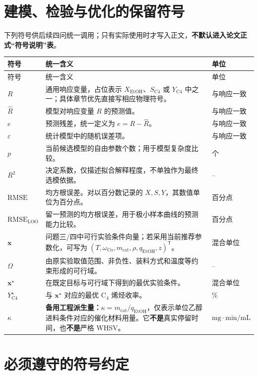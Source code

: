 \documentclass[UTF8,zihao=-4,a4paper,fontset=none]{ctexart}
\begin{document}
\section{建模、检验与优化的保留符号}

下列符号供后续四问统一调用；只有实际使用时才写入正文，\textbf{不默认进入论文正式“符号说明”表}。

\begin{longtable}{C{0.18\textwidth} L{0.52\textwidth} C{0.14\textwidth}}
\toprule
符号 & 统一含义 & 单位 \\
\midrule
\endfirsthead
\toprule
符号 & 统一含义 & 单位 \\
\midrule
\endhead
$R$ & 通用响应变量，占位表示 $X_{\mathrm{EtOH}}$、$S_{\mathrm{C4}}$ 或 $Y_{\mathrm{C4}}$ 中之一；具体章节优先直接写相应物理符号。 & 与响应一致 \\
$\widehat{R}$ & 模型对响应变量 $R$ 的预测值。 & 与响应一致 \\
$e$ & 预测残差，统一定义为 $e=R-\widehat{R}$。 & 与响应一致 \\
$\varepsilon$ & 统计模型中的随机误差项。 & 与响应一致 \\
$p$ & 当前候选模型的自由参数个数；用于模型复杂度比较。 & 个 \\
$R^2$ & 决定系数，仅描述拟合解释程度，不单独作为最终选模依据。 & -- \\
$\mathrm{RMSE}$ & 均方根误差。对以百分数记录的 $X,S,Y$，其数值单位为百分点。 & 百分点 \\
$\mathrm{RMSE}_{\mathrm{LOO}}$ & 留一预测的均方根误差，用于极小样本曲线的预测能力比较。 & 百分点 \\
$\bm{x}$ & 问题三/四中可行实验条件向量；若采用当前推荐参数化，可写为 $(T,\omega_{\mathrm{Co}},m_{\mathrm{cat}},\rho,q_{\mathrm{EtOH}},z)^{\mathsf T}$。 & 混合单位 \\
$\Omega$ & 由原实验取值范围、非负性、装料方式和温度等约束形成的可行域。 & -- \\
$\bm{x}^{\star}$ & 在既定目标与可行域下得到的最优实验条件。 & 混合单位 \\
$Y_{\mathrm{C4}}^{\star}$ & 与 $\bm{x}^{\star}$ 对应的最优 $\mathrm{C}_4$ 烯烃收率。 & \% \\
$\kappa$ & \textbf{备用工程派生量：}$\kappa=m_{\mathrm{cat}}/q_{\mathrm{EtOH}}$，仅表示单位乙醇进料条件对应的催化材料用量。它\textbf{不是}真实停留时间，也\textbf{不是}严格 WHSV。 & {\scriptsize$\mathrm{mg\cdot min/mL}$} \\
\bottomrule
\end{longtable}

\section{必须遵守的符号约定}
\end{document}
